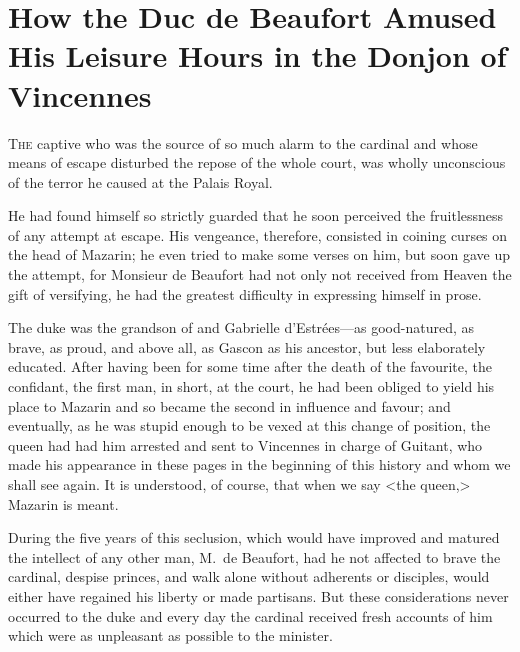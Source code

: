 \chapter[The Duc de Beaufort in the Donjon of Vincennes]{How the Duc de Beaufort Amused His Leisure Hours in the Donjon of Vincennes}


 \lettrine{T}{he} captive who was the source of so much alarm to the cardinal and whose means of escape disturbed the repose of the whole court, was wholly unconscious of the terror he caused at the Palais Royal.

\zz
He had found himself so strictly guarded that he soon perceived the fruitlessness of any attempt at escape. His vengeance, therefore, consisted in coining curses on the head of Mazarin; he even tried to make some verses on him, but soon gave up the attempt, for Monsieur de Beaufort had not only not received from Heaven the gift of versifying, he had the greatest difficulty in expressing himself in prose.

The duke was the grandson of  and Gabrielle d'Estrées—as good-natured, as brave, as proud, and above all, as Gascon as his ancestor, but less elaborately educated. After having been for some time after the death of  the favourite, the confidant, the first man, in short, at the court, he had been obliged to yield his place to Mazarin and so became the second in influence and favour; and eventually, as he was stupid enough to be vexed at this change of position, the queen had had him arrested and sent to Vincennes in charge of Guitant, who made his appearance in these pages in the beginning of this history and whom we shall see again. It is understood, of course, that when we say <the queen,> Mazarin is meant.

During the five years of this seclusion, which would have improved and matured the intellect of any other man, M.~de Beaufort, had he not affected to brave the cardinal, despise princes, and walk alone without adherents or disciples, would either have regained his liberty or made partisans. But these considerations never occurred to the duke and every day the cardinal received fresh accounts of him which were as unpleasant as possible to the minister.


